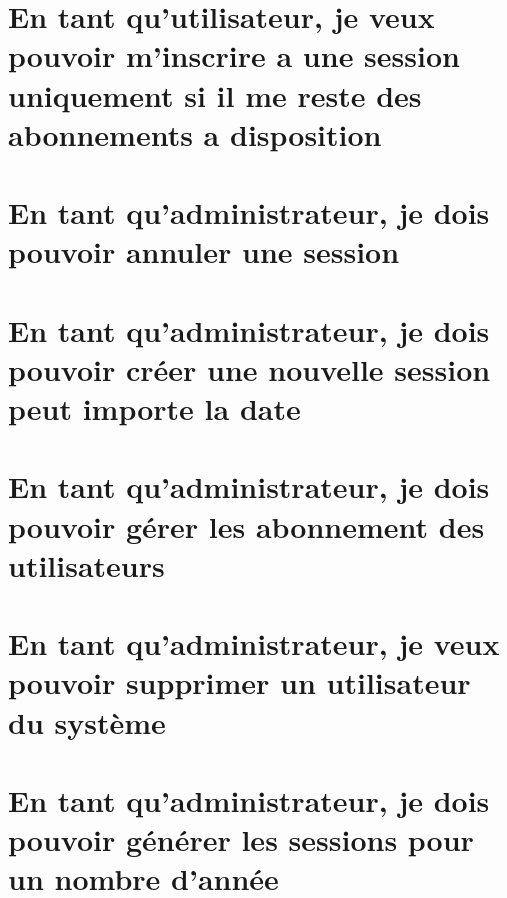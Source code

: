 \newpage
\section{En tant qu'utilisateur, je veux pouvoir m'inscrire a une session uniquement si il me reste des abonnements a disposition}
	

\vspace{\baselineskip}
\section{En tant qu’administrateur, je dois pouvoir annuler une session}
	
	
\section{En tant qu'administrateur, je dois pouvoir créer une nouvelle session peut importe la date}
	
	
\section{En tant qu'administrateur, je dois pouvoir gérer les abonnement des utilisateurs}
	
	
\section{En tant qu'administrateur, je veux pouvoir supprimer un utilisateur du système}
	
	
\section{En tant qu'administrateur, je dois pouvoir générer les sessions pour un nombre d'année}
	

